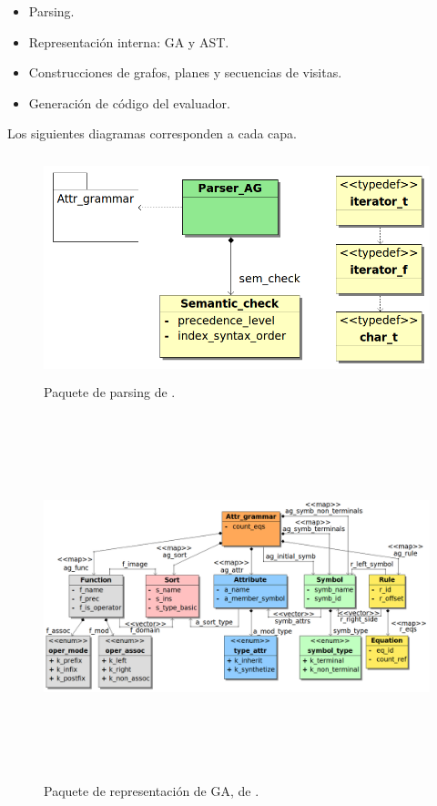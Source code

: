\begin{itemize}
\item Parsing.
\item Representación interna: GA y AST.
\item Construcciones de grafos, planes y secuencias de visitas.
\item Generación de código del evaluador.
\end{itemize}

Los siguientes diagramas corresponden a cada capa.

\begin{figure}[!ht]\centering
\includegraphics[width=350pt, height=184pt]{diagramas/Parser.png}
\caption{\label{fig:dia-parser}Paquete de parsing de \maggen.}
\end{figure}

\begin{figure}[!ht]\centering
\includegraphics[width=605pt, height=300pt, angle=90]{diagramas/Attr_grammar.png}
\caption{\label{fig:dia-grammar}Paquete de representación de GA, de \maggen.}
\end{figure}

